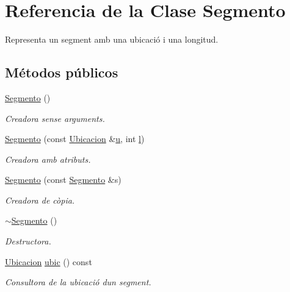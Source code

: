 \hypertarget{class_segmento}{}\section{Referencia de la Clase Segmento}
\label{class_segmento}


Representa un segment amb una ubicació i una longitud.  


\subsection*{Métodos públicos}
\begin{DoxyCompactItemize}
\item 
\hyperlink{class_segmento_af8ce1463824db8cd38084f4f75d3b192}{Segmento} ()
\begin{DoxyCompactList}\small\item\em Creadora sense arguments. \end{DoxyCompactList}\item 
\hyperlink{class_segmento_a325e58fb03daa6d14ceeb3c4759b042d}{Segmento} (const \hyperlink{class_ubicacion}{Ubicacion} \&\hyperlink{class_segmento_a7fab9490df9b1b655bb88c2deb6e72ef}{u}, int \hyperlink{class_segmento_a8b59abc9de156b52370dd759beab031d}{l})
\begin{DoxyCompactList}\small\item\em Creadora amb atributs. \end{DoxyCompactList}\item 
\hyperlink{class_segmento_a18576aa0c0d5d4200e23b84d760b5aa3}{Segmento} (const \hyperlink{class_segmento}{Segmento} \&s)
\begin{DoxyCompactList}\small\item\em Creadora de còpia. \end{DoxyCompactList}\item 
\hyperlink{class_segmento_a7a9ecb38532ea633aacdaa90be7c4769}{$\sim$\+Segmento} ()
\begin{DoxyCompactList}\small\item\em Destructora. \end{DoxyCompactList}\item 
\hyperlink{class_ubicacion}{Ubicacion} \hyperlink{class_segmento_aeb7bfd4dcac3a1a000a33582861e0d50}{ubic} () const
\begin{DoxyCompactList}\small\item\em Consultora de la ubicació d\textquotesingle{}un segment. \end{DoxyCompactList}\item 

\end{DoxyCompactItemize}
